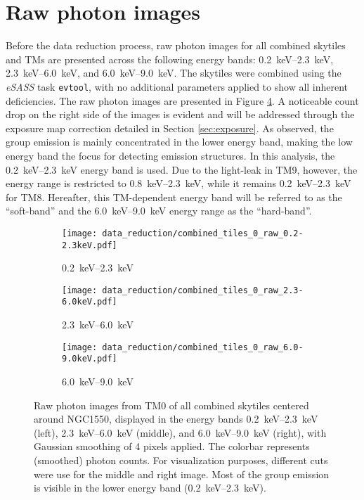 \section{Raw photon images}
Before the data reduction process, raw photon images for all combined skytiles and TMs are presented across the following energy bands: \SIrange{0.2}{2.3}{\kilo\electronvolt}, \SIrange{2.3}{6.0}{\kilo\electronvolt}, and \SIrange{6.0}{9.0}{\kilo\electronvolt}. The skytiles were combined using the \textit{eSASS} task \texttt{evtool}, with no additional parameters applied to show all inherent deficiencies. The raw photon images are presented in Figure \ref{fig:raw_photon_images}. A noticeable count drop on the right side of the images is evident and will be addressed through the exposure map correction detailed in Section \ref{sec:exposure}. As observed, the group emission is mainly concentrated in the lower energy band, making the low energy band the focus for detecting emission structures. In this analysis, the \SIrange{0.2}{2.3}{\kilo\electronvolt} energy band is used. Due to the light-leak in TM9, however, the energy range is restricted to \SIrange{0.8}{2.3}{\kilo\electronvolt}, while it remains \SIrange{0.2}{2.3}{\kilo\electronvolt} for TM8. Hereafter, this TM-dependent energy band will be referred to as the \enquote{soft-band} and the \SIrange{6.0}{9.0}{\kilo\electronvolt} energy range as the \enquote{hard-band}. 
\begin{figure}[htbp]
    \centering
    \begin{subfigure}{0.325\textwidth}
        \centering
        \texttt{[image: data\_reduction/combined\_tiles\_0\_raw\_0.2-2.3keV.pdf]}
        \caption{\SIrange{0.2}{2.3}{\kilo\electronvolt}}
        \label{fig:low_energy}
    \end{subfigure}
    \hfill
    \begin{subfigure}{0.325\textwidth}
        \centering
        \texttt{[image: data\_reduction/combined\_tiles\_0\_raw\_2.3-6.0keV.pdf]}
        \caption{\SIrange{2.3}{6.0}{\kilo\electronvolt}}
        \label{fig:mid_energy}
    \end{subfigure}
    \hfill
    \begin{subfigure}{0.325\textwidth}
        \centering
        \texttt{[image: data\_reduction/combined\_tiles\_0\_raw\_6.0-9.0keV.pdf]}
        \caption{\SIrange{6.0}{9.0}{\kilo\electronvolt}}
        \label{fig:high_energy}
    \end{subfigure}
    \caption{Raw photon images from TM0 of all combined skytiles centered around NGC1550, displayed in the energy bands \SIrange{0.2}{2.3}{\kilo\electronvolt} (left), \SIrange{2.3}{6.0}{\kilo\electronvolt} (middle), and \SIrange{6.0}{9.0}{\kilo\electronvolt} (right), with Gaussian smoothing of 4 pixels applied. The colorbar represents (smoothed) photon counts. For visualization purposes, different cuts were use for the middle and right image. Most of the group emission is visible in the lower energy band (\SIrange{0.2}{2.3}{\kilo\electronvolt}).}
    \label{fig:raw_photon_images}
\end{figure}
%
